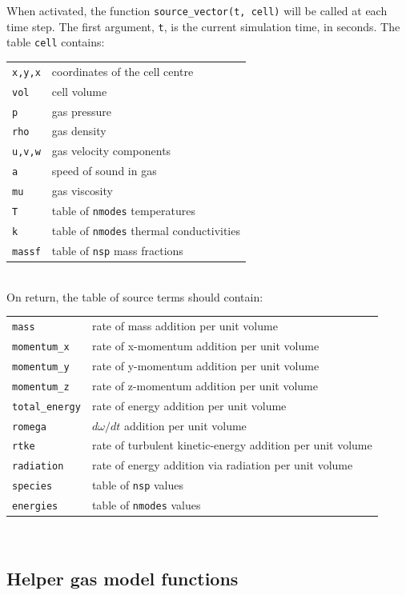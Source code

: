 \bigskip
When activated, the function \texttt{source\_vector(t, cell)} will be called at each time step.
The first argument, \texttt{t}, is the current simulation time, in seconds.
The table \texttt{cell} contains:\\
\begin{tabular}{ll}
 \texttt{x,y,x} & coordinates of the cell centre \\
 \texttt{vol} & cell volume \\
 \texttt{p} & gas pressure \\
 \texttt{rho} & gas density \\
 \texttt{u,v,w} & gas velocity components \\
 \texttt{a} & speed of sound in gas \\
 \texttt{mu} & gas viscosity \\
 \texttt{T} & table of \texttt{nmodes} temperatures \\
 \texttt{k} & table of \texttt{nmodes} thermal conductivities \\
 \texttt{massf} & table of \texttt{nsp} mass fractions \\
\end{tabular}\\
On return, the table of source terms should contain:\\
\begin{tabular}{ll}
 \texttt{mass} &  rate of mass addition per unit volume\\
 \texttt{momentum\_x} & rate of x-momentum addition per unit volume\\
 \texttt{momentum\_y} & rate of y-momentum addition per unit volume\\
 \texttt{momentum\_z} & rate of z-momentum addition per unit volume\\
 \texttt{total\_energy} & rate of energy addition per unit volume\\
 \texttt{romega} & $d\omega/dt$ addition per unit volume\\
 \texttt{rtke} & rate of turbulent kinetic-energy addition per unit volume\\
 \texttt{radiation} & rate of energy addition via radiation per unit volume\\
 \texttt{species} & table of \texttt{nsp} values\\
 \texttt{energies} & table of \texttt{nmodes} values\\
\end{tabular}\\

\subsection{Helper gas model functions}
\label{sec:udf-gas-service}

